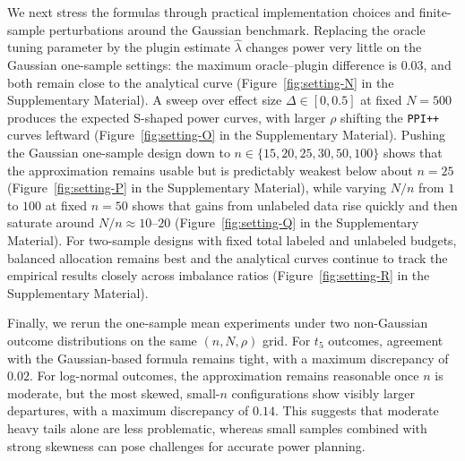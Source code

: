 \documentclass[12pt]{article}
\begin{document}
We next stress the formulas through practical implementation choices
and finite-sample perturbations around the Gaussian benchmark.
Replacing the oracle tuning parameter by the plugin estimate
$\hat\lambda$ changes power very little on the Gaussian one-sample settings: the maximum oracle--plugin difference is $0.03$, and both remain close to the analytical curve
(Figure~\ref{fig:setting-N} in the Supplementary Material). A sweep
over effect size $\Delta \in [0, 0.5]$ at fixed $N = 500$ produces the
expected S-shaped power curves, with larger $\rho$ shifting the
\texttt{PPI++} curves leftward (Figure~\ref{fig:setting-O} in the
Supplementary Material). Pushing the Gaussian one-sample design down to
$n \in \{15, 20, 25, 30, 50, 100\}$ shows that the approximation
remains usable but is predictably weakest below about $n = 25$
(Figure~\ref{fig:setting-P} in the Supplementary Material), while
varying $N/n$ from $1$ to $100$ at fixed $n = 50$ shows that gains from
unlabeled data rise quickly and then saturate around
$N/n \approx 10$--$20$ (Figure~\ref{fig:setting-Q} in the Supplementary
Material). For two-sample designs with fixed total labeled and
unlabeled budgets, balanced allocation remains best and the analytical
curves continue to track the empirical results closely across imbalance
ratios (Figure~\ref{fig:setting-R} in the Supplementary Material).

Finally, we rerun the one-sample mean experiments under two
non-Gaussian outcome distributions on the same $(n, N, \rho)$ grid. For
$t_5$ outcomes, agreement with the Gaussian-based formula remains tight,
with a maximum discrepancy of $0.02$. For log-normal outcomes, the
approximation remains reasonable once $n$ is moderate, but the most
skewed, small-$n$ configurations show visibly larger departures, with
a maximum discrepancy of $0.14$. This suggests that moderate heavy
tails alone are less problematic, whereas small samples combined with
strong skewness can pose challenges for accurate power planning.


\end{document}
